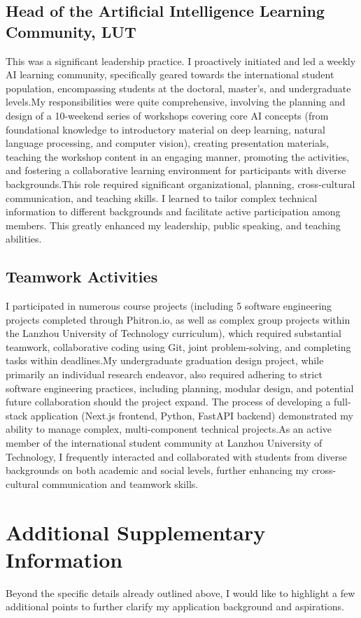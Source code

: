 \documentclass[12pt,a4paper]{article}
\begin{document}
\begin{CJK*}{UTF8}{gbsn}
\subsection*{Head of the Artificial Intelligence Learning Community, LUT}
This was a significant leadership practice. I proactively initiated and led a weekly AI learning community, specifically geared towards the international student population, encompassing students at the doctoral, master's, and undergraduate levels.My responsibilities were quite comprehensive, involving the planning and design of a 10-weekend series of workshops covering core AI concepts (from foundational knowledge to introductory material on deep learning, natural language processing, and computer vision), creating presentation materials, teaching the workshop content in an engaging manner, promoting the activities, and fostering a collaborative learning environment for participants with diverse backgrounds.This role required significant organizational, planning, cross-cultural communication, and teaching skills. I learned to tailor complex technical information to different backgrounds and facilitate active participation among members. This greatly enhanced my leadership, public speaking, and teaching abilities.


\subsection*{Teamwork Activities}
I participated in numerous course projects (including 5 software engineering projects completed through Phitron.io, as well as complex group projects within the Lanzhou University of Technology curriculum), which required substantial teamwork, collaborative coding using Git, joint problem-solving, and completing tasks within deadlines.My undergraduate graduation design project, while primarily an individual research endeavor, also required adhering to strict software engineering practices, including planning, modular design, and potential future collaboration should the project expand. The process of developing a full-stack application (Next.js frontend, Python, FastAPI backend) demonstrated my ability to manage complex, multi-component technical projects.As an active member of the international student community at Lanzhou University of Technology, I frequently interacted and collaborated with students from diverse backgrounds on both academic and social levels, further enhancing my cross-cultural communication and teamwork skills.


\section*{Additional Supplementary Information}
Beyond the specific details already outlined above, I would like to highlight a few additional points to further clarify my application background and aspirations.


\end{CJK*}
\end{document}
